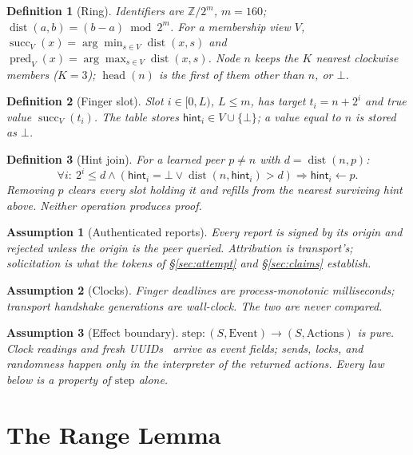 \documentclass[journal]{IEEEtran}
\newtheorem{definition}{Definition}
\newtheorem{assumption}{Assumption}
\newcommand{\dist}{\operatorname{dist}}
\newcommand{\succf}{\operatorname{succ}}
\newcommand{\pred}{\operatorname{pred}}
\newcommand{\head}{\operatorname{head}}
\newcommand{\hint}{\mathsf{hint}}
\begin{document}
\begin{definition}[Ring]\label{def:ring}
Identifiers are $\mathbb{Z}/2^{m}$, $m=160$; $\dist(a,b)=(b-a)\bmod 2^{m}$.
For a membership view $V$, $\succf_V(x)=\arg\min_{s\in V}\dist(x,s)$ and
$\pred_V(x)=\arg\max_{s\in V}\dist(x,s)$.  Node $n$ keeps the $K$ nearest
clockwise members ($K=3$); $\head(n)$ is the first of them other than $n$,
or $\bot$.
\end{definition}

\begin{definition}[Finger slot]\label{def:slot}
Slot $i\in[0,L)$, $L\le m$, has target $t_i=n+2^{i}$ and true value
$\succf_V(t_i)$.  The table stores $\hint_i\in V\cup\{\bot\}$; a value equal
to $n$ is stored as $\bot$.
\end{definition}

\begin{definition}[Hint join]\label{def:join}
For a learned peer $p\ne n$ with $d=\dist(n,p)$:
\[
\forall i:\ 2^{i}\le d\wedge(\hint_i=\bot\vee\dist(n,\hint_i)>d)
\Rightarrow\hint_i\gets p .
\]
Removing $p$ clears every slot holding it and refills from the nearest
surviving hint above.  Neither operation produces proof.
\end{definition}

\begin{assumption}[Authenticated reports]\label{as:auth}
Every report is signed by its origin and rejected unless the origin is the
peer queried.  Attribution is transport's; \emph{solicitation} is what the
tokens of \S\ref{sec:attempt} and \S\ref{sec:claims} establish.
\end{assumption}

\begin{assumption}[Clocks]\label{as:clock}
Finger deadlines are process-monotonic milliseconds; transport handshake
generations are wall-clock.  The two are never compared.
\end{assumption}

\begin{assumption}[Effect boundary]\label{as:effects}
$\mathrm{step}:(S,\mathrm{Event})\to(S,\mathrm{Actions})$ is pure.  Clock
readings and fresh UUIDs~\cite{RFC9562} arrive as event fields; sends,
locks, and randomness happen only in the interpreter of the returned
actions.  Every law below is a property of $\mathrm{step}$ alone.
\end{assumption}

\section{The Range Lemma}\label{sec:range}
\end{document}

